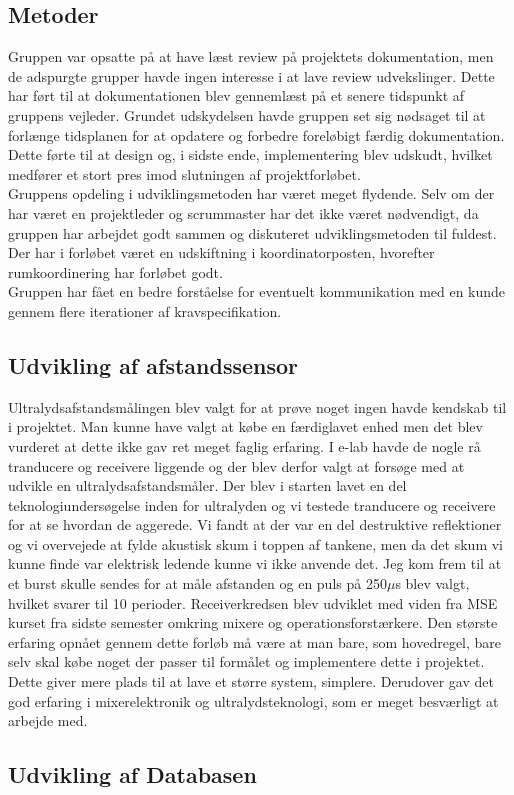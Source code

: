 \subsection{Metoder}
Gruppen var opsatte på at have læst review på projektets dokumentation, men de adspurgte grupper havde ingen interesse i at lave review udvekslinger. Dette har ført til at dokumentationen blev gennemlæst på et senere tidspunkt af gruppens vejleder. Grundet udskydelsen havde gruppen set sig nødsaget til at forlænge tidsplanen for at opdatere og forbedre foreløbigt færdig dokumentation. Dette førte til at design og, i sidste ende, implementering blev udskudt, hvilket medfører et stort pres imod slutningen af projektforløbet.\\
Gruppens opdeling i udviklingsmetoden har været meget flydende. Selv om der har været en projektleder og scrummaster har det ikke været nødvendigt, da gruppen har arbejdet godt sammen og diskuteret udviklingsmetoden til fuldest. Der har i forløbet været en udskiftning i koordinatorposten, hvorefter rumkoordinering har forløbet godt.\\
Gruppen har fået en bedre forståelse for eventuelt kommunikation med en kunde gennem flere iterationer af kravspecifikation.

\subsection{Udvikling af afstandssensor}
Ultralydsafstandsmålingen blev valgt for at prøve noget ingen havde kendskab til i projektet. Man kunne have valgt at købe en færdiglavet enhed men det blev vurderet at dette ikke gav ret meget faglig erfaring. I e-lab havde de nogle rå tranducere og receivere liggende og der blev derfor valgt at forsøge med at udvikle en ultralydsafstandsmåler. Der blev i starten lavet en del teknologiundersøgelse inden for ultralyden og vi testede tranducere og receivere for at se hvordan de aggerede. Vi fandt at der var en del destruktive reflektioner og vi overvejede at fylde akustisk skum i toppen af tankene, men da det skum vi kunne finde var elektrisk ledende kunne vi ikke anvende det. Jeg kom frem til at et burst skulle sendes for at måle afstanden og en puls på 250$\mu$s blev valgt, hvilket svarer til 10 perioder. Receiverkredsen blev udviklet med viden fra MSE kurset fra sidste semester omkring mixere og operationsforstærkere. Den største erfaring opnået gennem dette forløb må være at man bare, som hovedregel, bare selv skal købe noget der passer til formålet og implementere dette i projektet. Dette giver mere plads til at lave et større system, simplere. Derudover gav det god erfaring i mixerelektronik og ultralydsteknologi, som er meget besværligt at arbejde med.

\subsection{Udvikling af Databasen}
